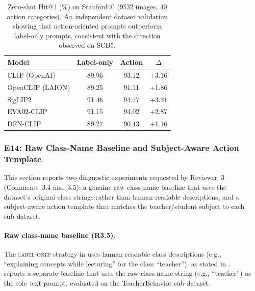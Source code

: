 \documentclass[symmetry,article,submit,pdftex,moreauthors]{Definitions/mdpi}
\begin{document}
\begin{table}[H]
\caption{Zero-shot Hit@1 (\%) on Stanford40 (9532 images, 40 action categories). An independent dataset validation showing that action-oriented prompts outperform label-only prompts, consistent with the direction observed on SCB5.}
\label{tab:stanford40}
\centering
\small
\begin{tabular}{lccc}
\toprule
\textbf{Model} & \textbf{Label-only} & \textbf{Action} & \textbf{$\Delta$} \\
\midrule
CLIP (OpenAI) & 89.96 & 93.12 & +3.16 \\
OpenCLIP (LAION) & 89.25 & 91.11 & +1.86 \\
SigLIP2 & 91.46 & 94.77 & +3.31 \\
EVA02-CLIP & 91.15 & 94.02 & +2.87 \\
DFN-CLIP & 89.27 & 90.43 & +1.16 \\
\bottomrule
\end{tabular}
\end{table}


\subsubsection{E14: Raw Class-Name Baseline and Subject-Aware Action Template}
\label{sec:e14_raw_label}

This section reports two diagnostic experiments requested by Reviewer~3 (Comments~3.4 and~3.5): a genuine raw-class-name baseline that uses the dataset's original class strings rather than human-readable descriptions, and a subject-aware action template that matches the teacher/student subject to each sub-dataset.

\paragraph{Raw class-name baseline (R3.5).}
The \textsc{label-only} strategy in  uses human-readable class descriptions (e.g., ``explaining concepts while lecturing'' for the class ``teacher''), as stated in .  reports a separate baseline that uses the raw class-name string (e.g., ``teacher'') as the sole text prompt, evaluated on the TeacherBehavior sub-dataset.
\end{document}
